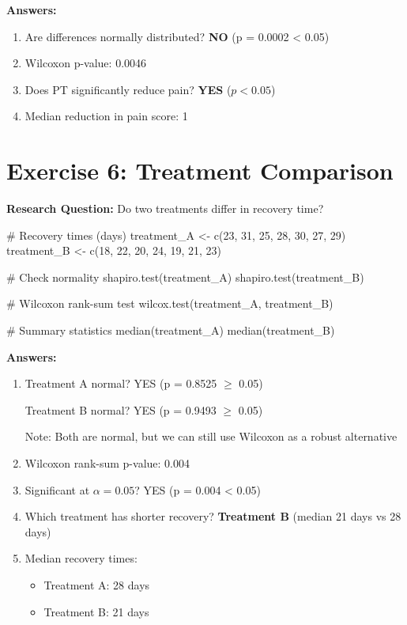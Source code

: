\documentclass[11pt]{article}
\begin{document}
\textbf{Answers:}
\begin{enumerate}
\item \textcolor{answergreen}{Are differences normally distributed? \textbf{NO} (p = 0.0002 < 0.05)}
\item \textcolor{answergreen}{Wilcoxon p-value: 0.0046}
\item \textcolor{answergreen}{Does PT significantly reduce pain? \textbf{YES} ($p < 0.05$)}
\item \textcolor{answergreen}{Median reduction in pain score: 1}
\end{enumerate}

\section{Exercise 6: Treatment Comparison}

\textbf{Research Question:} Do two treatments differ in recovery time?

\begin{rcode}
# Recovery times (days)
treatment_A <- c(23, 31, 25, 28, 30, 27, 29)
treatment_B <- c(18, 22, 20, 24, 19, 21, 23)

# Check normality
shapiro.test(treatment_A)
shapiro.test(treatment_B)

# Wilcoxon rank-sum test
wilcox.test(treatment_A, treatment_B)

# Summary statistics
median(treatment_A)
median(treatment_B)
\end{rcode}

\textbf{Answers:}
\begin{enumerate}
\item \textcolor{answergreen}{Treatment A normal? YES (p = 0.8525 $\geq$ 0.05)}

\textcolor{answergreen}{Treatment B normal? YES (p = 0.9493 $\geq$ 0.05)}

\textcolor{answergreen}{Note: Both are normal, but we can still use Wilcoxon as a robust alternative}

\item \textcolor{answergreen}{Wilcoxon rank-sum p-value: 0.004}

\item \textcolor{answergreen}{Significant at $\alpha = 0.05$? YES (p = 0.004 < 0.05)}

\item \textcolor{answergreen}{Which treatment has shorter recovery? \textbf{Treatment B} (median 21 days vs 28 days)}

\item \textcolor{answergreen}{Median recovery times:}
\begin{itemize}
\item \textcolor{answergreen}{Treatment A: 28 days}
\item \textcolor{answergreen}{Treatment B: 21 days}
\end{itemize}
\end{enumerate}
\end{document}
